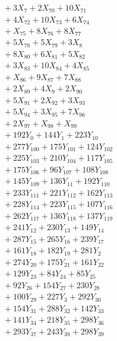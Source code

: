 \documentclass[a4paper,10pt]{article}
\begin{document}
{\begin{align}
&\quad  + 3X_{7} + 2X_{70} + 10X_{71} \\[0.5ex]
&\quad  + 4X_{72} + 10X_{73} + 6X_{74} \\[0.5ex]
&\quad  + X_{75} + 8X_{76} + 8X_{77} \\[0.5ex]
&\quad  + 5X_{78} + 5X_{79} + 3X_{8} \\[0.5ex]
&\quad  + 8X_{80} + 6X_{81} + 5X_{82} \\[0.5ex]
&\quad  + 3X_{83} + 10X_{84} + 4X_{85} \\[0.5ex]
&\quad  + X_{86} + 9X_{87} + 7X_{88} \\[0.5ex]
&\quad  + 2X_{89} + 4X_{9} + 2X_{90} \\[0.5ex]
&\quad  + 5X_{91} + 2X_{92} + 3X_{93} \\[0.5ex]
&\quad  + 5X_{94} + 3X_{95} + 7X_{96} \\[0.5ex]
&\quad  + 2X_{97} + X_{98} + X_{99} \\[0.5ex]
&\quad  + 192Y_{0} + 144Y_{1} + 223Y_{10} \\[0.5ex]
&\quad  + 277Y_{100} + 175Y_{101} + 124Y_{102} \\[0.5ex]
&\quad  + 225Y_{103} + 210Y_{104} + 117Y_{105} \\[0.5ex]
&\quad  + 175Y_{106} + 96Y_{107} + 108Y_{108} \\[0.5ex]
&\quad  + 145Y_{109} + 136Y_{11} + 192Y_{110} \\[0.5ex]
&\quad  + 233Y_{111} + 221Y_{112} + 162Y_{113} \\[0.5ex]
&\quad  + 228Y_{114} + 223Y_{115} + 107Y_{116} \\[0.5ex]
&\quad  + 262Y_{117} + 136Y_{118} + 137Y_{119} \\[0.5ex]
&\quad  + 241Y_{12} + 230Y_{13} + 149Y_{14} \\[0.5ex]
&\quad  + 287Y_{15} + 265Y_{16} + 239Y_{17} \\[0.5ex]
&\quad  + 161Y_{18} + 182Y_{19} + 281Y_{2} \\[0.5ex]
&\quad  + 274Y_{20} + 175Y_{21} + 161Y_{22} \\[0.5ex]
&\quad  + 129Y_{23} + 84Y_{24} + 85Y_{25} \\[0.5ex]
&\quad  + 92Y_{26} + 154Y_{27} + 230Y_{28} \\[0.5ex]
&\quad  + 100Y_{29} + 227Y_{3} + 292Y_{30} \\[0.5ex]
&\quad  + 154Y_{31} + 288Y_{32} + 142Y_{33} \\[0.5ex]
&\quad  + 141Y_{34} + 218Y_{35} + 298Y_{36} \\[0.5ex]
&\quad  + 293Y_{37} + 243Y_{38} + 298Y_{39} \\[0.5ex]

\end{align}}
\end{document}
